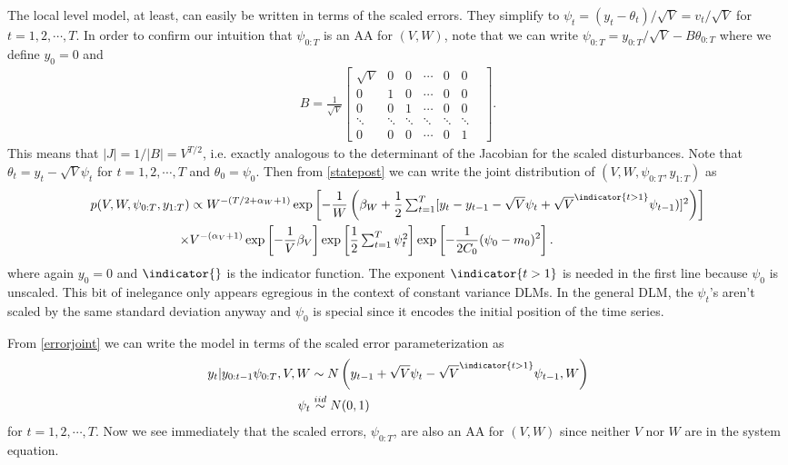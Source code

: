 The local level model, at least, can easily be written in terms of the scaled errors. They simplify to $\psi_t = (y_t - \theta_t)/\sqrt{V}=v_t/\sqrt{V}$ for $t=1,2,\cdots,T$. In order to confirm our intuition that $\psi_{0:T}$ is an AA for $(V,W)$, note that we can write $\psi_{0:T} = y_{0:T}/\sqrt{V} - B \theta_{0:T}$ where we define $y_0=0$ and 
\begin{align*}
B=\frac{1}{\sqrt{V}}\begin{bmatrix} \sqrt{V} & 0 & 0 & \cdots & 0 & 0 \\
  0 & 1 & 0 & \cdots & 0 & 0 \\
  0 &  0 & 1 &  \cdots & 0 & 0 \\
  \ddots &   \ddots &   \ddots &\ddots &  \ddots &   \ddots & \\
  0 & 0 & 0 & \cdots & 0 & 1 \end{bmatrix}.
\end{align*}
This means that $|J|=1/|B|=V^{T/2}$, i.e. exactly analogous to the determinant of the Jacobian for the scaled disturbances. Note that $\theta_t = y_t - \sqrt{V}\psi_t$ for $t=1,2,\cdots,T$ and $\theta_0=\psi_0$. Then from \eqref{statepost} we can write the joint distribution of $(V,W,\psi_{0:T},y_{1:T})$ as
\begin{align}
  p(V,W,\psi_{0:T},y_{1:T}) &\propto W^{-\left(T/2 + \alpha_W + 1\right)} \exp\left[-\frac{1}{W}\left(\beta_W + \frac{1}{2}\textstyle\sum_{t=1}^T[ y_t - y_{t-1} - \sqrt{V}\psi_t + \sqrt{V}^{\indicator{t>1}}\psi_{t-1})]^2 \right) \right]  \nonumber\\
  \times &  V^{-\left(\alpha_V + 1\right)} \exp\left[-\frac{1}{V}\beta_V\right]\exp\left[\frac{1}{2} \textstyle\sum_{t=1}^T\psi_t^2\right] \exp\left[-\frac{1}{2C_0}(\psi_0 - m_0)^2\right]\label{errorjoint}. 
\end{align}
where again $y_0=0$ and $\indicator{}$ is the indicator function. The exponent $\indicator{t>1}$ is needed in the first line because $\psi_0$ is unscaled. This bit of inelegance only appears egregious in the context of constant variance DLMs. In the general DLM, the $\psi_t$'s aren't scaled by the same standard deviation anyway and $\psi_0$ is special since it encodes the initial position of the time series.

From \eqref{errorjoint} we can write the model in terms of the scaled error parameterization as
\begin{align*}
  y_t|y_{0:t-1}\psi_{0:T},V,W & \sim N\left(y_{t-1} + \sqrt{V}\psi_t - \sqrt{V}^{\indicator{t>1}}\psi_{t-1},W\right)\\
  \psi_t & \stackrel{iid}{\sim}N(0,1)
\end{align*}
for $t=1,2,\cdots,T$. Now we see immediately that the scaled errors, $\psi_{0:T}$, are also an AA for $(V,W)$ since neither $V$ nor $W$ are in the system equation.

